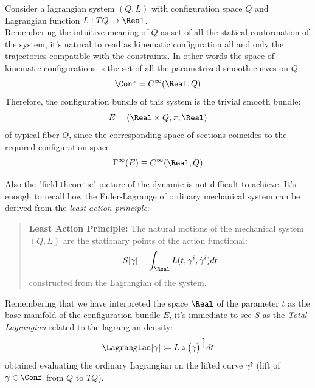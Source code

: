 \documentclass[Main]{subfiles}
\begin{document}
			Consider a lagrangian system $(Q, L)$ with configuration space $Q$ and Lagrangian function $L: TQ\rightarrow \Real$.
			\\
			Remembering the intuitive meaning of $Q$ as set of all the statical conformation of the system, it's natural to read as kinematic configuration all and only the trajectories compatible with the constraints.
			In other words the space of kinematic configurations is the set of all the parametrized smooth curves on $Q$:
			\begin{displaymath}
				\Conf = C^\infty(\Real,Q)
			\end{displaymath}
			Therefore, the configuration bundle of this system is the trivial smooth bundle:
			\begin{displaymath}
				E= ( \Real\times Q, \pi, \Real)
			\end{displaymath}
			of typical fiber $Q$, since the corresponding space of sections coincides to  the required configuration space:
			\begin{displaymath}
				\Gamma^\infty(E) \equiv C^\infty(\Real,Q)
			\end{displaymath}

			Also the "field theoretic" picture of the dynamic is not difficult to achieve.
			It's enough to recall how the Euler-Lagrange of ordinary mechanical system can be derived from the \emph{least action principle}:
			\begin{quotation}
				\textbf{Least Action Principle:}
				The natural motions of the mechanical system $(Q,L)$ are the stationary points of the action functional:
				\begin{displaymath}
					S [\gamma]= \int_\Real L(t,\gamma^i, \dot{\gamma}^i) dt
				\end{displaymath}
				constructed from the Lagrangian of the system.
			\end{quotation}
			Remembering that we have interpreted the space $\Real$ of the parameter $t$ as the base manifold of the configuration bundle $E$, it's immediate to see $S$ as the \emph{Total Lagrangian} related to the lagrangian density:
			\begin{displaymath}
				\Lagrangian[\gamma] \coloneqq L \circ \big( \gamma \big)^{\big\uparrow} dt
			\end{displaymath}
			obtained evaluating the ordinary Lagrangian on the lifted curve $\gamma^\uparrow$ (lift of $\gamma\in \Conf$ from $Q$ to $TQ$).
		
\end{document}
